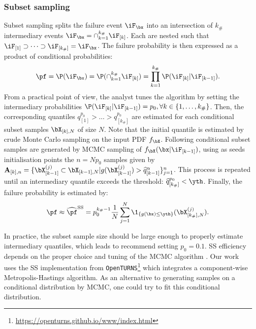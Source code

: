 \subsubsection{Subset sampling}

Subset sampling splits the failure event $\iF_{\bx}$ into an intersection of $k_\#$ intermediary events $\iF_{\bx} = \cap_{k=1}^{k_\#} \iF_{[k]}$.
Each are nested such that $\iF_{[1]} \supset \dots \supset \iF_{[k_\#]} = \iF_{\bx}$.
The failure probability is then expressed as a product of conditional probabilities:
\begin{equation}
    \pf = \P(\iF_{\bx}) = \P(\cap_{k=1}^{k_\#} \iF_{[k]}) = \prod_{k=1}^{k_\#} \P(\iF_{[k]} | \iF_{[k-1]}).
\end{equation}
From a practical point of view, the analyst tunes the algorithm by setting the intermediary probabilities $\P(\iF_{[k]} | \iF_{[k-1]}) = p_0, \forall k \in \{1, \dots, k_\# \}$. 
Then, the corresponding quantiles $q_{[1]}^{p_0} > \dots > q_{[k_\#]}^{p_0}$ are estimated for each conditional subset samples $\bX_{[k], N}$ of size $N$. 
Note that the initial quantile is estimated by crude Monte Carlo sampling on the input PDF $f_{\bX}$. 
Following conditional subset samples are generated by MCMC sampling of $f_{\bX}(\bx |\iF_{[k-1]})$, using as seeds initialisation points the $n= N p_0$ samples given by $\mathbf{A}_{[k], n}=\{\bX_{[k-1]}^{(j)} \subset \bX_{[k-1], N}| g(\bX_{[k-1]}^{(j)}) > \widehat{q}_{[k-1]}^\alpha \}_{j=1}^n$. 
This process is repeated until an intermediary quantile exceeds the threshold: $\widehat{q}_{[k_\#]}^{p_0} < \yth$. 
Finally, the failure probability is estimated by:
\begin{equation}
    \pf \approx \widehat{\pf}^{\mathrm{SS}} = p_0^{k_\# -1} \frac1N \sum_{j=1}^N \1_{\{g(\bx) \leq \yth\}} (\bX_{[k_\#],N}^{(j)}).
\end{equation}

In practice, the subset sample size should be large enough to properly estimate intermediary quantiles, which leads \cite{AuBeck2001} to recommend setting $p_0=0.1$. SS efficiency depends on the proper choice and tuning of the MCMC algorithm \citep{Papaioannou_PEM_2015}. 
Our work uses the SS implementation from \texttt{OpenTURNS}\footnote{\href{https://openturns.github.io/www/index.html}{https://openturns.github.io/www/index.html}} \citep{baudin_dutfoy_2017} which integrates a component-wise Metropolis-Hastings algorithm. 
As an alternative to generating samples on a conditional distribution by MCMC, one could try to fit this conditional distribution.

